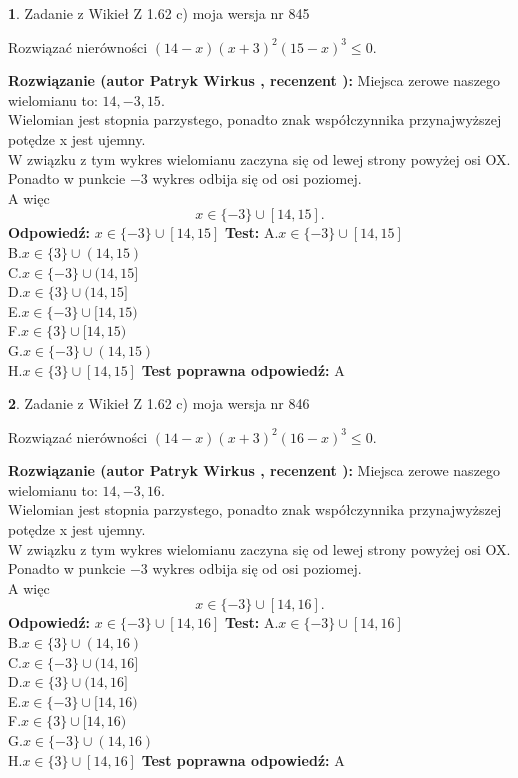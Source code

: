 \documentclass[12pt, a4paper]{article}
\theoremstyle{definition} %
\newtheorem{zad}{}
\newcommand{\zadStart}[1]{\begin{zad}#1\newline}
\newcommand{\zadStop}{\end{zad}}
\newcommand{\rozwStart}[2]{\noindent \textbf{Rozwiązanie (autor #1 , recenzent #2): }\newline}
\newcommand{\rozwStop}{\newline}
\newcommand{\odpStart}{\noindent \textbf{Odpowiedź:}\newline}
\newcommand{\odpStop}{\newline}
\newcommand{\testStart}{\noindent \textbf{Test:}\newline}
\newcommand{\testStop}{\newline}
\newcommand{\kluczStart}{\noindent \textbf{Test poprawna odpowiedź:}\newline}
\newcommand{\kluczStop}{\newline}
\begin{document}
\zadStart{Zadanie z Wikieł Z 1.62 c) moja wersja nr 845}

Rozwiązać nierówności $(14-x)(x+3)^{2}(15-x)^{3}\le0$.
\zadStop
\rozwStart{Patryk Wirkus}{}
Miejsca zerowe naszego wielomianu to: $14, -3, 15$.\\
Wielomian jest stopnia parzystego, ponadto znak współczynnika przy\linebreak najwyższej potędze x jest ujemny.\\ W związku z tym wykres wielomianu zaczyna się od lewej strony powyżej osi OX.\\
Ponadto w punkcie $-3$ wykres odbija się od osi poziomej.\\
A więc $$x \in \{-3\} \cup [14,15].$$
\rozwStop
\odpStart
$x \in \{-3\} \cup [14,15]$
\odpStop
\testStart
A.$x \in \{-3\} \cup [14,15]$\\
B.$x \in \{3\} \cup (14,15)$\\
C.$x \in \{-3\} \cup (14,15]$\\
D.$x \in \{3\} \cup (14,15]$\\
E.$x \in \{-3\} \cup [14,15)$\\
F.$x \in \{3\} \cup [14,15)$\\
G.$x \in \{-3\} \cup (14,15)$\\
H.$x \in \{3\} \cup [14,15]$
\testStop
\kluczStart
A
\kluczStop



\zadStart{Zadanie z Wikieł Z 1.62 c) moja wersja nr 846}

Rozwiązać nierówności $(14-x)(x+3)^{2}(16-x)^{3}\le0$.
\zadStop
\rozwStart{Patryk Wirkus}{}
Miejsca zerowe naszego wielomianu to: $14, -3, 16$.\\
Wielomian jest stopnia parzystego, ponadto znak współczynnika przy\linebreak najwyższej potędze x jest ujemny.\\ W związku z tym wykres wielomianu zaczyna się od lewej strony powyżej osi OX.\\
Ponadto w punkcie $-3$ wykres odbija się od osi poziomej.\\
A więc $$x \in \{-3\} \cup [14,16].$$
\rozwStop
\odpStart
$x \in \{-3\} \cup [14,16]$
\odpStop
\testStart
A.$x \in \{-3\} \cup [14,16]$\\
B.$x \in \{3\} \cup (14,16)$\\
C.$x \in \{-3\} \cup (14,16]$\\
D.$x \in \{3\} \cup (14,16]$\\
E.$x \in \{-3\} \cup [14,16)$\\
F.$x \in \{3\} \cup [14,16)$\\
G.$x \in \{-3\} \cup (14,16)$\\
H.$x \in \{3\} \cup [14,16]$
\testStop
\kluczStart
A
\kluczStop
\end{document}
